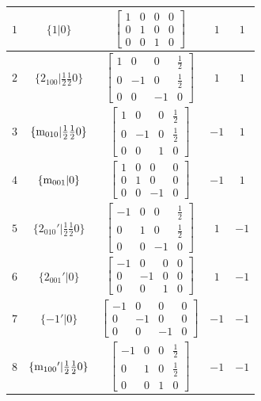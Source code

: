 \documentclass[fleqn,8pt]{jsarticle}
\begin{document}
\begin{longtable}{ccccc}
$ 1 $ & $ \{1|0\} $ & $ \begin{bmatrix} 1 & 0 & 0 & 0 \\ 0 & 1 & 0 & 0 \\ 0 & 0 & 1 & 0 \end{bmatrix} $ & $ 1 $ & $ 1 $ \\ \hline
$ 2 $ & $ \{2{}_{100}|\frac{1}{2} \frac{1}{2} 0\} $ & $ \begin{bmatrix} 1 & 0 & 0 & \frac{1}{2} \\ 0 & -1 & 0 & \frac{1}{2} \\ 0 & 0 & -1 & 0 \end{bmatrix} $ & $ 1 $ & $ 1 $ \\ \hline
$ 3 $ & $ \{{\rm m}_{010}|\frac{1}{2} \frac{1}{2} 0\} $ & $ \begin{bmatrix} 1 & 0 & 0 & \frac{1}{2} \\ 0 & -1 & 0 & \frac{1}{2} \\ 0 & 0 & 1 & 0 \end{bmatrix} $ & $ -1 $ & $ 1 $ \\ \hline
$ 4 $ & $ \{{\rm m}_{001}|0\} $ & $ \begin{bmatrix} 1 & 0 & 0 & 0 \\ 0 & 1 & 0 & 0 \\ 0 & 0 & -1 & 0 \end{bmatrix} $ & $ -1 $ & $ 1 $ \\ \hline
$ 5 $ & $ \{2{}_{010}{}'|\frac{1}{2} \frac{1}{2} 0\} $ & $ \begin{bmatrix} -1 & 0 & 0 & \frac{1}{2} \\ 0 & 1 & 0 & \frac{1}{2} \\ 0 & 0 & -1 & 0 \end{bmatrix} $ & $ 1 $ & $ -1 $ \\ \hline
$ 6 $ & $ \{2{}_{001}{}'|0\} $ & $ \begin{bmatrix} -1 & 0 & 0 & 0 \\ 0 & -1 & 0 & 0 \\ 0 & 0 & 1 & 0 \end{bmatrix} $ & $ 1 $ & $ -1 $ \\ \hline
$ 7 $ & $ \{-1{}'|0\} $ & $ \begin{bmatrix} -1 & 0 & 0 & 0 \\ 0 & -1 & 0 & 0 \\ 0 & 0 & -1 & 0 \end{bmatrix} $ & $ -1 $ & $ -1 $ \\ \hline
$ 8 $ & $ \{{\rm m}_{100}{}'|\frac{1}{2} \frac{1}{2} 0\} $ & $ \begin{bmatrix} -1 & 0 & 0 & \frac{1}{2} \\ 0 & 1 & 0 & \frac{1}{2} \\ 0 & 0 & 1 & 0 \end{bmatrix} $ & $ -1 $ & $ -1 $ \\
\end{longtable}
\end{document}
